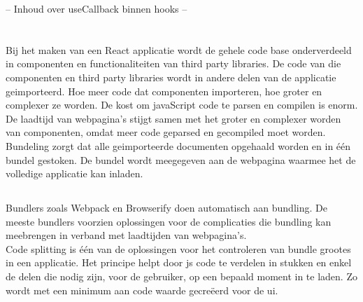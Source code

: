 -- Inhoud over useCallback binnen hooks --


\section{}

\subsection{}
\label{sec:bundeling}

Bij het maken van een React applicatie wordt de gehele code base onderverdeeld in componenten en functionaliteiten van third party libraries. De code van die componenten en third party libraries wordt in andere delen van de applicatie geimporteerd. Hoe meer code dat componenten importeren, hoe groter en complexer ze worden. De kost om javaScript code te parsen en compilen is enorm. De laadtijd van webpagina's stijgt samen met het groter en complexer worden van componenten, omdat meer code geparsed en gecompiled moet worden.\\
Bundeling zorgt dat alle geimporteerde documenten opgehaald worden en in één bundel gestoken. De bundel wordt meegegeven aan de webpagina waarmee het de volledige applicatie kan inladen.  

\subsection{}
\label{sec:codeSplitting}

Bundlers zoals Webpack en Browserify doen automatisch aan bundling. De meeste bundlers voorzien oplossingen voor de complicaties die bundling kan meebrengen in verband met laadtijden van webpagina's.\\
Code splitting is één van de oplossingen voor het controleren van bundle grootes in een applicatie. Het principe helpt door \gls{js} code te verdelen in stukken en enkel de delen die nodig zijn, voor de gebruiker, op een bepaald moment in te laden. Zo wordt met een minimum aan code waarde gecreëerd voor de \gls{ui}.\\




